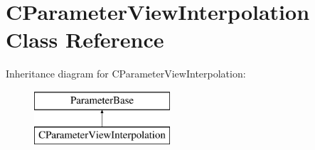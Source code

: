 \hypertarget{class_c_parameter_view_interpolation}{}\section{C\+Parameter\+View\+Interpolation Class Reference}
\label{class_c_parameter_view_interpolation}
Inheritance diagram for C\+Parameter\+View\+Interpolation\+:\begin{figure}[H]
\begin{center}
\leavevmode
\includegraphics[height=2.000000cm]{class_c_parameter_view_interpolation}
\end{center}
\end{figure}
